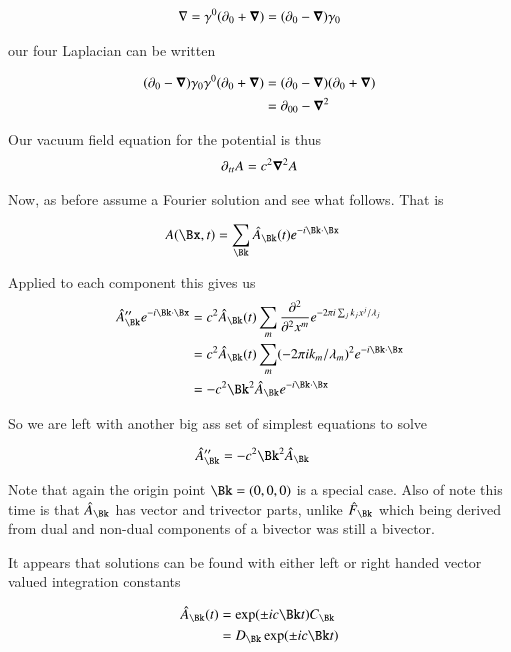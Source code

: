 \documentclass{article}
\begin{document}
\begin{align*}
\nabla = \gamma^0(\partial_0 + \boldsymbol{\nabla}) = (\partial_0 - \boldsymbol{\nabla}) \gamma_0
\end{align*}

our four Laplacian can be written

\begin{align*}
(\partial_0 - \boldsymbol{\nabla}) \gamma_0 \gamma^0(\partial_0 + \boldsymbol{\nabla}) 
&= (\partial_0 - \boldsymbol{\nabla}) (\partial_0 + \boldsymbol{\nabla}) \\
&= \partial_{00} - \boldsymbol{\nabla}^2
\end{align*}

Our vacuum field equation for the potential is thus
\begin{align}
\partial_{tt} A = c^2 \boldsymbol{\nabla}^2 A
\end{align}

Now, as before assume a Fourier solution and see what follows.  That is

\begin{align}\label{eqn:assumedPotential}
A(\Bx, t) &= \sum_{\Bk} \hat{A}_{\Bk}(t) e^{ -i \Bk \cdot \Bx}
\end{align}

Applied to each component this gives us
\begin{align*}
\hat{A}_{\Bk}'' e^{ -i \Bk \cdot \Bx} 
&= c^2 \hat{A}_{\Bk}(t) \sum_m \PDsq{x^m}{} e^{ - 2 \pi i \sum_j k_j x^j /\lambda_j} \\
&= c^2 \hat{A}_{\Bk}(t) \sum_m (- 2 \pi i k_m/\lambda_m)^2 e^{ - i \Bk \cdot \Bx } \\
&= -c^2 \Bk^2 \hat{A}_{\Bk} e^{ - i \Bk \cdot \Bx }
\end{align*}

So we are left with another big ass set of simplest equations to solve

\begin{align*}
\hat{A}_{\Bk}'' &= -c^2 \Bk^2 \hat{A}_{\Bk}
\end{align*}

Note that again the origin point $\Bk = (0,0,0)$ is a special case.  Also of note this time is that $\hat{A}_{\Bk}$ has vector and trivector parts, unlike $\hat{F}_{\Bk}$ which being derived from dual and non-dual components of a bivector was still a bivector.

It appears that solutions can be found with either left or right handed
vector valued integration constants

\begin{align*}
\hat{A}_{\Bk}(t) &= \exp(\pm i c \Bk t) C_{\Bk} \\
                 &= D_{\Bk} \exp(\pm i c \Bk t)
\end{align*}
\end{document}
